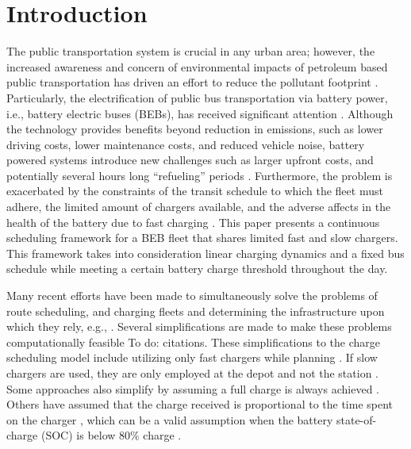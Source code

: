 \documentclass[utf8]{FrontiersinHarvard}
\let\cite\citep                                                                 %
\newcommand{\TODO}[1]{{\color{green} To do: #1}}                                %
\begin{document}

\section{Introduction}
\label{sec:introduction}
The public transportation system is crucial in any urban area; however, the increased awareness and concern of
environmental impacts of petroleum based public transportation has driven an effort to reduce the pollutant footprint
\cite{DeFilippo2014, Xylia2018, Guida2017, Li2016}. Particularly, the electrification of public bus transportation via
battery power, i.e., battery electric buses (BEBs), has received significant attention \cite{Li2016}. Although the
technology provides benefits beyond reduction in emissions, such as lower driving costs, lower maintenance costs, and
reduced vehicle noise, battery powered systems introduce new challenges such as larger upfront costs, and potentially
several hours long ``refueling'' periods \cite{Xylia2018, Li2016}. Furthermore, the problem is exacerbated by the
constraints of the transit schedule to which the fleet must adhere, the limited amount of chargers available, and the
adverse affects in the health of the battery due to fast charging \cite{Lutsey2019}. This paper presents a continuous
scheduling framework for a BEB fleet that shares limited fast and slow chargers. This framework takes into consideration
linear charging dynamics and a fixed bus schedule while meeting a certain battery charge threshold throughout the day.

Many recent efforts have been made to simultaneously solve the problems of route scheduling, and charging fleets and determining
the infrastructure upon which they rely, e.g., \cite{Wei2018, Sebastiani2016, Hoke2014, Wang2017}. Several simplifications
are made to make these problems computationally feasible \TODO{citations}. These simplifications to the charge
scheduling model include utilizing only fast chargers while planning \cite{Wei2018, Sebastiani2016, Wang2017,
  Zhou2020-0, Liu2020, Yang2018, Wang2017a, Qin2016}. If slow chargers are used, they are only employed at the depot and
not the station \cite{He2020, Tang2019}. Some approaches also simplify by assuming a full charge is always achieved \cite{Wei2018, Wang2017, Zhou2020-0,
  Wang2017a}. Others have assumed that the charge received is proportional to the time spent on the charger
\cite{Liu2020, Yang2018}, which can be a valid assumption when the battery state-of-charge (SOC) is below 80\% charge
\cite{Liu2020}.
\end{document}
